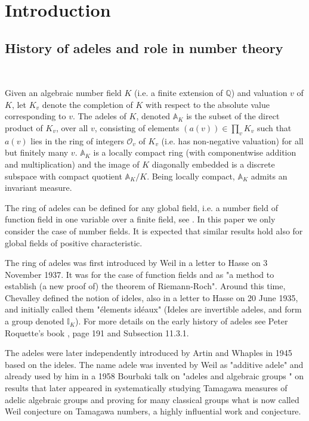 \documentclass[12pt]{amsart}
\def\A{\mathbb{A}}
\def\I{\mathbb{I}}
\def\Q{\mathbb{Q}}
\numberwithin{equation}{section}
\begin{document}
\tableofcontents


\section{\bf Introduction}\label{sec-introduction}

\medskip

\subsection{\bf History of adeles and role in number theory} 

\

\medskip

Given an algebraic number field $K$ (i.e. a finite extension of $\Q$) and valuation $v$ of $K$, 
let $K_v$ denote the completion of $K$ with respect to the absolute value corresponding to $v$. 
The adeles of $K$, denoted $\A_K$ is the 
subset of the direct product of $K_v$, over all $v$, consisting of elements $(a(v))\in \prod_v K_v$ such that $a(v)$ lies in the ring of integers $\mathcal{O}_{v}$ of $K_v$ (i.e. has non-negative valuation) for all but finitely many $v$. $\A_K$ is a locally compact 
ring (with componentwise addition and multiplication) and the image of $K$ diagonally embedded is a discrete subspace with compact quotient $\A_K/K$. Being locally compact, $\A_K$ admits an invariant measure. 

The ring of adeles can be defined for any global field, i.e. a number field of function field in one variable over a finite field, see \cite{CF}. In this paper we only consider the case of number fields. It is expected that similar results hold also for global fields of positive characteristic. 

The ring of adeles was first introduced by Weil in a letter to Hasse on 3 November 1937. It was for the case of function fields and as "a method to establish (a new proof of) the theorem of Riemann-Roch". Around this time, Chevalley defined the notion of ideles, also in a letter to Hasse on 20 June 1935, and initially called them "\'{e}lements id\'{e}aux" (Ideles are invertible adeles, and form a group denoted $\I_K$). For more details on the early history of adeles see Peter Roquette's book \cite{roquette-book}, page 191 and Subsection 11.3.1.

The adeles were later independently introduced by Artin and Whaples in 1945 based on the ideles. The name adele was invented by Weil as "additive adele" and already used by him in a 1958 Bourbaki talk on "adeles and algebraic groups " 
on results that later appeared in \cite{weil-adeles-gps} systematically studying Tamagawa measures of adelic algebraic groups 
and proving for many classical groups what is now called Weil conjecture on Tamagawa numbers, a highly influential work and conjecture. 
\end{document}
